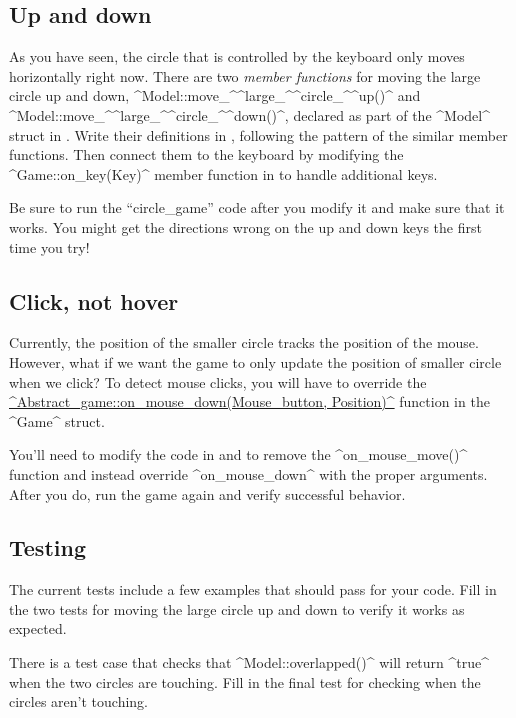 \documentclass{tufte-handout}
\begin{document}
\subsection{Up and down}

As you have seen, the circle that is controlled by the keyboard only
moves horizontally right now. There are two \emph{member functions} for
moving the large circle up and down,
^Model::move_^\-^large_^\-^circle_^\-^up()^ and
^Model::move_^\-^large_^\-^circle_^\-^down()^, declared as part of the
^Model^ struct in . Write their definitions in
, following the pattern of the similar member functions.
Then connect them to the keyboard by modifying the ^Game::on_key(Key)^
member function in  to handle additional keys.

Be sure to run the ``circle_game'' code after you modify it and make sure
that it works. You might get the directions wrong on the up and down keys
the first time you try!

\subsection{Click, not hover}

Currently, the position of the smaller circle tracks the position of the
mouse. However, what if we want the game to only update the position of
smaller circle when we click? To detect mouse clicks, you will have to
override the
\href{https://tov.github.io/ge211/classge211_1_1_abstract__game.html#ae010e7d2f2f51229f45eb2046e1a5bde}
{^Abstract_game::on_mouse_down(Mouse_button, Position)^}
function in the ^Game^ struct.

You'll need to modify the code in  and  to
remove the ^on_mouse_move()^ function and instead override ^on_mouse_down^ with
the proper arguments. After you do, run the game again and verify successful
behavior.

\subsection{Testing}

The current tests include a few examples that should pass
for your code. Fill in the two tests for moving the large circle up and down
to verify it works as expected.

There is a test case that checks that ^Model::overlapped()^ will return ^true^
when the two circles are touching. Fill in the final test for checking when the
circles aren't touching.
\end{document}
